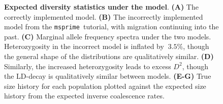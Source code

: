 \documentclass{article}
\newcommand{\msprime}[0]{\texttt{msprime}}
\begin{document}
\begin{figure}[ht]
\begin{center}
\caption{\textbf{Expected diversity statistics under the \citet{gutenkunst2009inferring} model}.
    \textbf{(A)} The correctly implemented model.
    \textbf{(B)} The incorrectly implemented model from the \msprime\ tutorial, with migration continuing
    into the past.
    \textbf{(C)} Marginal allele frequency spectra under the two models. Heterozygosity in the incorrect model
    is inflated by $~3.5\%$, though the general shape of the distributions are qualitatively similar.
    \textbf{(D)} Similarly, the increased heterozygosity leads to excess $D^2$, though the LD-decay is
    qualitatively similar between models.
    \textbf{(E-G)} True size history for each population plotted against the expected size history from 
    the expected inverse coalescence rates.
}
\label{fig:ooa_stats}
\end{center}
\end{figure}
\end{document}
